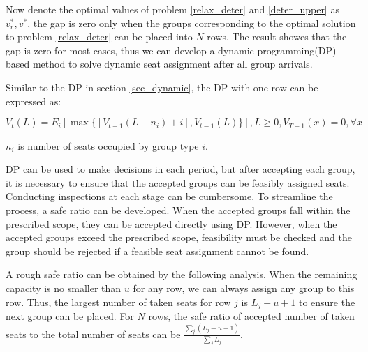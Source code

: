 Now denote the optimal values of problem \eqref{relax_deter} and \eqref{deter_upper} as $v_{r}^{*}, v^{*}$, the gap is zero only when the groups corresponding to the optimal solution to problem \eqref{relax_deter} can be placed into $N$ rows. The result showes that the gap is zero for most cases, thus we can develop a dynamic programming(DP)-based method to solve dynamic seat assignment after all group arrivals.

Similar to the DP in section \ref{sec_dynamic}, the DP with one row can be expressed as:

$$V_{t}(L) = E_{i} [\max\{ {[V_{t-1}(L-n_i)+ i]}, {V_{t-1}(L)}\}], L \geq 0, V_{T+1}(x) =0, \forall x$$

$n_i$ is number of seats occupied by group type $i$.


DP can be used to make decisions in each period, but after accepting each group, it is necessary to ensure that the accepted groups can be feasibly assigned seats. Conducting inspections at each stage can be cumbersome. To streamline the process, a safe ratio can be developed. When the accepted groups fall within the prescribed scope, they can be accepted directly using DP. However, when the accepted groups exceed the prescribed scope, feasibility must be checked and the group should be rejected if a feasible seat assignment cannot be found.


A rough safe ratio can be obtained by the following analysis. When the remaining capacity is no smaller than $u$ for any row, we can always assign any group to this row. Thus, the largest number of taken seats for row $j$ is $L_j -u +1$ to ensure the next group can be placed. For $N$ rows, the safe ratio of accepted number of taken seats to the total number of seats can be $\frac{\sum_{j} (L_j -u +1)}{\sum_{j} L_j}$.



